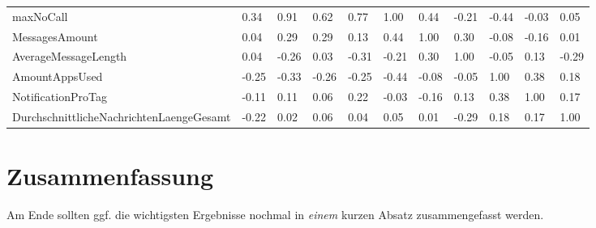 \begin{table}[]
\begin{tabular}{lllllllllll}
maxNoCall                                & \cellcolor[HTML]{4FD22F}0.34  & 0.91                         & 0.62                         & 0.77                         & 1.00                         & 0.44                         & -0.21                        & -0.44                         & -0.03                         & 0.05                                     \\
MessagesAmount                           & \cellcolor[HTML]{4FD22F}0.04  & 0.29                         & 0.29                         & 0.13                         & 0.44                         & 1.00                         & 0.30                         & -0.08                         & -0.16                         & 0.01                                     \\
AverageMessageLength                     & \cellcolor[HTML]{4FD22F}0.04  & -0.26                        & 0.03                         & -0.31                        & -0.21                        & 0.30                         & 1.00                         & -0.05                         & 0.13                          & -0.29                                    \\
AmountAppsUsed                           & \cellcolor[HTML]{4FD22F}-0.25 & -0.33                        & -0.26                        & -0.25                        & -0.44                        & -0.08                        & -0.05                        & 1.00                          & 0.38                          & 0.18                                     \\
NotificationProTag                       & \cellcolor[HTML]{4FD22F}-0.11 & 0.11                         & 0.06                         & 0.22                         & -0.03                        & -0.16                        & 0.13                         & 0.38                          & 1.00                          & 0.17                                     \\
DurchschnittlicheNachrichtenLaengeGesamt & \cellcolor[HTML]{4FD22F}-0.22 & 0.02                         & 0.06                         & 0.04                         & 0.05                         & 0.01                         & -0.29                        & 0.18                          & 0.17                          & 1.00                                    
\end{tabular}
\end{table}



\section{Zusammenfassung}
\label{ch:Evaluierung:sec:zusammenfassung}

Am Ende sollten ggf. die wichtigsten Ergebnisse nochmal in \emph{einem}
kurzen Absatz zusammengefasst werden.

